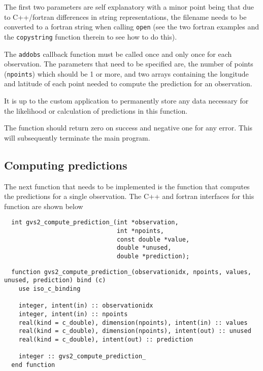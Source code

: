 \documentclass{article}
\begin{document}
The first two parameters are self explanatory with a minor point being that due
to C++/fortran differences in string representations, the filename needs to be
converted to a fortran string when calling {\tt open} (see the two fortran
examples and the {\tt copystring} function therein to see how to do this).

The {\tt addobs} callback function must be called once and only once for each
observation. The parameters that need to be specified are, the number of
points ({\tt npoints}) which should be 1 or more, and two arrays containing
the longitude and latitude of each point needed to compute the prediction
for an observation.

It is up to the custom application to permanently store any data
necessary for the likelihood or calculation of predictions in this
function.

The function should return zero on success and negative one for any
error.  This will subsequently terminate the main program.

\subsection{Computing predictions}

The next function that needs to be implemented is the function that computes
the predictions for a single observation. The C++ and fortran interfaces for this function
are shown below


\begin{verbatim}
  int gvs2_compute_prediction_(int *observation,
                               int *npoints,
                               const double *value,
                               double *unused,
                               double *prediction);
\end{verbatim}

\begin{verbatim}
  function gvs2_compute_prediction_(observationidx, npoints, values, unused, prediction) bind (c)
    use iso_c_binding
    
    integer, intent(in) :: observationidx
    integer, intent(in) :: npoints
    real(kind = c_double), dimension(npoints), intent(in) :: values
    real(kind = c_double), dimension(npoints), intent(out) :: unused
    real(kind = c_double), intent(out) :: prediction

    integer :: gvs2_compute_prediction_
  end function
\end{verbatim}
\end{document}
